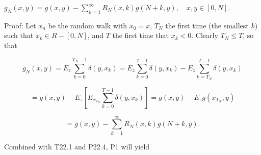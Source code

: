 $g_N(x,y) = g(x,y) - \sum_{k=1}^{\infty} R_N(x,k)g(N+k,y), \quad x,y \in [0,N]$.

Proof: Let $x_n$ be the random walk with $x_0 = x$, $T_N$ the first time (the smallest $k$) such that $x_k \in R - [0,N]$, and $T$ the first time that $x_k < 0$. Clearly $T_N \leq T$, so that

$$g_N(x,y) = E_z \sum_{k=0}^{T_N-1} \delta(y,x_k) = E_z \sum_{k=0}^{T-1} \delta(y,x_k) - E_z \sum_{k=T_N}^{T-1} \delta(y,x_k)$$

$$= g(x,y) - E_z \left[ E_{x_T_N} \sum_{k=0}^{T-1} \delta(y,x_k) \right] = g(x,y) - E_z g(x_T_N,y)$$

$$= g(x,y) - \sum_{k=1}^{\infty} R_N(x,k)g(N+k,y).$$

Combined with T22.1 and P22.4, P1 will yield